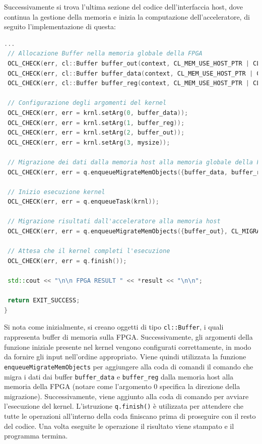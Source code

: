 \noindent Successivamente si trova l'ultima sezione del codice dell'interfaccia host, dove continua la gestione della memoria e inizia la computazione dell'acceleratore, di seguito l'implementazione di questa: 
\begin{lstlisting}[language=C++]
...
 // Allocazione Buffer nella memoria globale della FPGA
 OCL_CHECK(err, cl::Buffer buffer_out(context, CL_MEM_USE_HOST_PTR | CL_MEM_WRITE_ONLY, sizeof(int32_t), result, &err));
 OCL_CHECK(err, cl::Buffer buffer_data(context, CL_MEM_USE_HOST_PTR | CL_MEM_READ_ONLY, sizeof(struct Memory), data, &err));
 OCL_CHECK(err, cl::Buffer buffer_reg(context, CL_MEM_USE_HOST_PTR | CL_MEM_READ_ONLY, sizeof(struct Registers), reg, &err));

 // Configurazione degli argomenti del kernel
 OCL_CHECK(err, err = krnl.setArg(0, buffer_data));
 OCL_CHECK(err, err = krnl.setArg(1, buffer_reg));
 OCL_CHECK(err, err = krnl.setArg(2, buffer_out));
 OCL_CHECK(err, err = krnl.setArg(3, mysize));

 // Migrazione dei dati dalla memoria host alla memoria globale della FPGA
 OCL_CHECK(err, err = q.enqueueMigrateMemObjects({buffer_data, buffer_reg}, 0 /*from host*/));

 // Inizio esecuzione kernel
 OCL_CHECK(err, err = q.enqueueTask(krnl));

 // Migrazione risultati dall'acceleratore alla memoria host 
 OCL_CHECK(err, err = q.enqueueMigrateMemObjects({buffer_out}, CL_MIGRATE_MEM_OBJECT_HOST));

 // Attesa che il kernel completi l'esecuzione
 OCL_CHECK(err, err = q.finish());

 std::cout << "\n\n FPGA RESULT " << *result << "\n\n";

 return EXIT_SUCCESS;
}
\end{lstlisting}
Si nota come inizialmente, si creano oggetti di tipo \texttt{cl::Buffer}, i quali rappresenta buffer di memoria sulla FPGA. Successivamente, gli argomenti della funzione iniziale presente nel kernel vengono configurati correttamente, in modo da fornire gli input nell'ordine appropriato. Viene quindi utilizzata la funzione \texttt{enqueueMigrateMemObjects} per aggiungere alla coda di comandi il comando che migra i dati dai buffer \texttt{buffer\_data} e \texttt{buffer\_reg} dalla memoria host alla memoria della FPGA (notare come l'argomento 0 specifica la direzione della migrazione). Successivamente, viene aggiunto alla coda di comando per avviare l'esecuzione del kernel.
L'istruzione \texttt{q.finish()} è utilizzata per attendere che tutte le operazioni all'interno della coda finiscano prima di proseguire con il resto del codice.
Una volta eseguite le operazione il risultato viene stampato e il programma termina.

